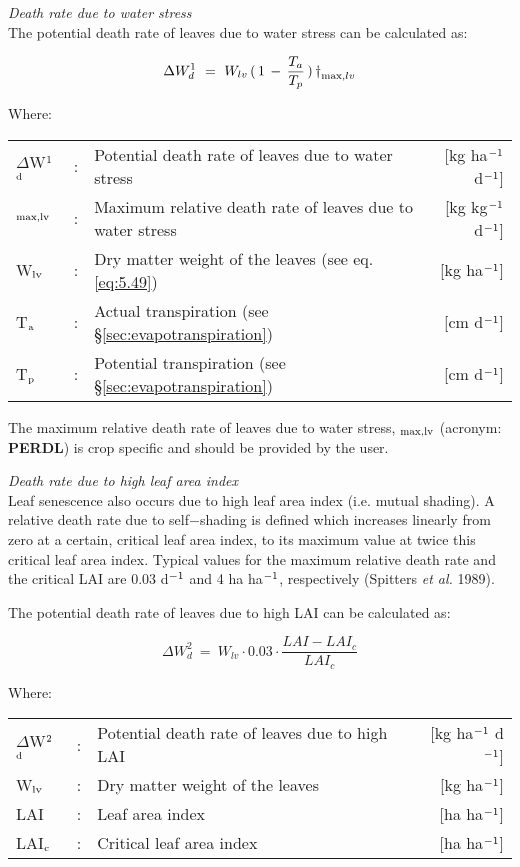 {\it Death rate due to water stress}\\
The potential death rate of leaves due to water stress can be calculated as:

\begin{equation}
\Delta W_{d}^{1} ~=~ W_{lv} \, (\, 1\, -\,{\frac{T _{a} }{T _{p} }} \, )\, {\rm \dag } _{\max ,lv} 
\end{equation}

Where:\\[5pt]
\begin{tabularx}{\textwidth}{llXr}
	$\Delta$W$^{{\rm 1}}$$_{{\rm d}}$ &:& Potential death rate of leaves due to water stress   &
	[kg  ha$^{{\rm -1}}$ d$^{{\rm -1}}$]\\
	\dag $_{{\rm max,lv}}$ &:& Maximum relative death rate of leaves due to
	water stress   &     [kg kg$^{{\rm -1}}$ d$^{{\rm -1}}$]\\
	W$_{{\rm lv}}$ &:& Dry matter weight of the leaves (see eq. \ref{eq:5.49})  &
	[kg ha$^{{\rm -1}}$]\\
	T$_{{\rm a}}$ &:& Actual transpiration (see \S \ref{sec:evapotranspiration})    &
	[cm d$^{{\rm -1}}$]\\
	T$_{{\rm p}}$ &:& Potential transpiration (see \S \ref{sec:evapotranspiration})   &
	[cm d$^{{\rm -1}}$]\\
\end{tabularx}

The maximum relative death rate of leaves due to water stress, {\bf \dag $_{{\rm max,lv}}$} 
(acronym: {\bf PERDL}) is crop specific and should be provided by the user.

{\it Death rate due to high leaf area index}\\
Leaf senescence also occurs due to high leaf area index (i.e. mutual shading). A relative
death rate due to self$-$shading is defined which increases linearly from zero at a certain,
critical leaf area index, to its maximum value at twice this critical leaf area index. Typical
values for the maximum relative death rate and the critical LAI are 0.03 d$^{{\rm -1}}$ and 4 
ha ha$^{{\rm -}{1}}$, respectively (Spitters {\it et al.} 1989).

The potential death rate of leaves due to high LAI can be calculated as:

\begin{equation}
\Delta W_{d}^{2} ~=~ W_{lv} \cdot 0.03 \cdot {\frac{LAI - LAI_c}{LAI_c}}
\end{equation}

Where:\\[5pt]
\begin{tabularx}{\textwidth}{llXr}
	$\Delta$W$^{{\rm 2}}$$_{{\rm d}}$ &:& Potential death rate of leaves due to 
	high LAI   &    [kg ha$^{{\rm -1}}$ d$^{{\rm -1}}$]\\
	W$_{{\rm lv}}$ &:& Dry matter weight of the leaves  &  [kg ha$^{{\rm -1}}$]\\
	LAI &:& Leaf area index   &    [ha ha$^{{\rm -1}}$]\\
	LAI$_{{\rm c}}$ &:& Critical leaf area index   &     [ha ha$^{{\rm -1}}$]\\
\end{tabularx}

